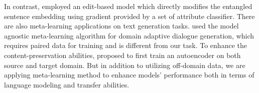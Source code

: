 In contrast, \citet{Liu2019} employed an edit-based model which directly modifies the entangled sentence embedding using gradient provided by a set of attribute classifier.
There are also meta-learning applications on text generation tasks. \citet{qian2019domain} used the model agnostic meta-learning algorithm for domain adaptive dialogue generation, which requires paired data for training and is different from our task. To enhance the content-preservation abilities, \citet{li2019domain} proposed to first train an autoencoder on both source and target domain. But in addition to utilizing off-domain data, we are applying meta-learning method to enhance models' performance both in terms of language modeling and transfer abilities.

